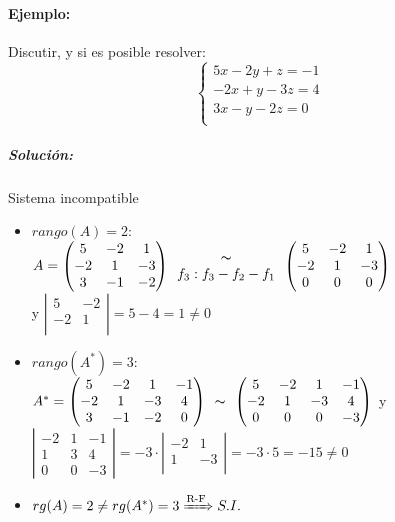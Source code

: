 \paragraph{Ejemplo:}
Discutir, y si es posible resolver:
$$\left\{ \begin{matrix}5 x - 2 y + z = -1 \\ - 2 x + y - 3 z = 4 \\ 3 x - y - 2 z = 0 \\ \end{matrix}\right.$$
\subparagraph{Solución:} Sistema incompatible
\begin{itemize}
    \item $rango(A) =2$: \\  $A=\left(\begin{matrix}5 & -2 & 1\\-2 & 1 & -3\\3 & -1 & -2\end{matrix}\right) \begin{array}{c}
     \thicksim   \\
     f_3:f_3-f_2-f_1 \\
 \end{array}
 \left(\begin{matrix}5 & -2 & 1\\-2 & 1 & -3\\0 & 0 & 0\end{matrix}\right)$ \\ y $\left|\begin{matrix}5 & -2 \\-2 & 1 \\ \end{matrix}\right| = 5-4=1\neq0 $ 
    \item $rango(A^*) =3$: \\
    $A^*=\left(\begin{matrix}5 & -2 & 1 & -1\\-2 & 1 & -3 & 4\\3 & -1 & -2 & 0\end{matrix}\right)\begin{array}{c}
     \thicksim   \\
    \end{array}
    \left(\begin{matrix}5 & -2 & 1 & -1\\-2 & 1 & -3 & 4\\0 & 0 & 0 & -3\end{matrix}\right)$ y  
    $\left|\begin{matrix}-2 & 1 & -1 \\1 & 3 & 4 \\ 0&0&-3 \end{matrix}\right| = -3\cdot   
    \left|\begin{matrix}-2 & 1\\1 & -3 \\ \end{matrix}\right|=-3\cdot 5=-15\neq0$
    
    \item $rg(A)=2 \neq rg(A^*)=3 \xRightarrow{\text{R-F}} S.I. $
\end{itemize}

